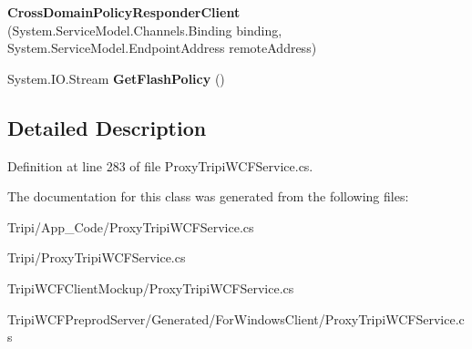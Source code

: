 \begin{DoxyCompactItemize}
\item 
\hypertarget{class_tripi_w_c_f_1_1_client_mockup_1_1_proxy_1_1_cross_domain_policy_responder_client_a25830c515ea9a9a917bdbfb0f93fe948}{
{\bfseries CrossDomainPolicyResponderClient} (System.ServiceModel.Channels.Binding binding, System.ServiceModel.EndpointAddress remoteAddress)}
\label{class_tripi_w_c_f_1_1_client_mockup_1_1_proxy_1_1_cross_domain_policy_responder_client_a25830c515ea9a9a917bdbfb0f93fe948}

\item 
\hypertarget{class_tripi_w_c_f_1_1_client_mockup_1_1_proxy_1_1_cross_domain_policy_responder_client_a0246400572a505db33fd2489f6d879af}{
System.IO.Stream {\bfseries GetFlashPolicy} ()}
\label{class_tripi_w_c_f_1_1_client_mockup_1_1_proxy_1_1_cross_domain_policy_responder_client_a0246400572a505db33fd2489f6d879af}

\end{DoxyCompactItemize}


\subsection{Detailed Description}


Definition at line 283 of file ProxyTripiWCFService.cs.

The documentation for this class was generated from the following files:\begin{DoxyCompactItemize}
\item 
Tripi/App\_\-Code/ProxyTripiWCFService.cs\item 
Tripi/ProxyTripiWCFService.cs\item 
TripiWCFClientMockup/ProxyTripiWCFService.cs\item 
TripiWCFPreprodServer/Generated/ForWindowsClient/ProxyTripiWCFService.cs\end{DoxyCompactItemize}
